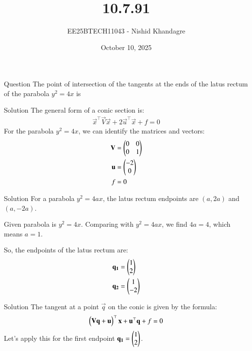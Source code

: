 \documentclass{beamer}
\title
{10.7.91}
\date{October 10, 2025}
\author
{EE25BTECH11043 - Nishid Khandagre}
\begin{document}
\frame{\titlepage}

\begin{frame}{Question}
The point of intersection of the tangents at the ends of the latus rectum of the parabola $y^2 = 4x$ is
\end{frame}

\begin{frame}{Solution}
The general form of a conic section is:
\begin{align}
\vec{x}^{\top}\vec{V}\vec{x} + 2\vec{u}^{\top}\vec{x} + f = 0
\end{align}
For the parabola $y^2 = 4x$, we can identify the matrices and vectors:
\begin{align}
\mathbf{V} &= \begin{pmatrix}0 & 0 \\ 0 & 1\end{pmatrix} \\
\mathbf{u} &= \begin{pmatrix}-2 \\ 0\end{pmatrix} \\
f &= 0
\end{align}
\end{frame}

\begin{frame}{Solution}
For a parabola $y^2 = 4ax$, the latus rectum endpoints are $(a, 2a)$ and $(a, -2a)$.

Given parabola is $y^2 = 4x$.
Comparing with $y^2 = 4ax$, we find $4a = 4$, which means $a=1$.

So, the endpoints of the latus rectum are:
\begin{align}
\mathbf{q_1} &= \begin{pmatrix}1 \\ 2\end{pmatrix} \\
\mathbf{q_2} &= \begin{pmatrix}1 \\ -2\end{pmatrix}
\end{align}
\end{frame}

\begin{frame}{Solution}
The tangent at a point $\vec{q}$ on the conic is given by the formula:
\begin{align}
\begin{pmatrix}\mathbf{V}\mathbf{q} + \mathbf{u}\end{pmatrix}^{\top}\mathbf{x} + \mathbf{u}^{\top}\mathbf{q} + f = 0
\end{align}
Let's apply this for the first endpoint $\mathbf{q_1} = \begin{pmatrix}1 \\ 2\end{pmatrix}$.
\end{frame}
\end{document}
